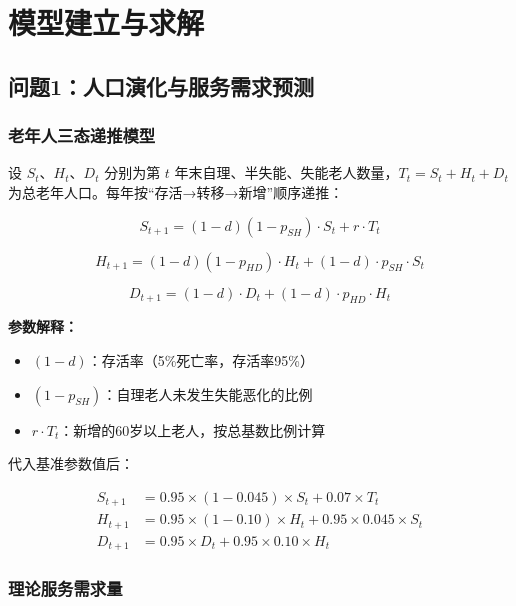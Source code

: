 \documentclass[UTF8]{ctexart}
\begin{document}
\section{模型建立与求解}
\subsection{问题1：人口演化与服务需求预测}

\subsubsection{老年人三态递推模型}

设 $S_t$、$H_t$、$D_t$ 分别为第 $t$ 年末自理、半失能、失能老人数量，$T_t=S_t+H_t+D_t$ 为总老年人口。每年按“存活→转移→新增”顺序递推：

\begin{equation}
S_{t+1} = (1-d)(1-p_{SH})\cdot S_t + r\cdot T_t \tag{1.1}
\end{equation}

\begin{equation}
H_{t+1} = (1-d)(1-p_{HD})\cdot H_t + (1-d)\cdot p_{SH}\cdot S_t \tag{1.2}
\end{equation}

\begin{equation}
D_{t+1} = (1-d)\cdot D_t + (1-d)\cdot p_{HD}\cdot H_t \tag{1.3}
\end{equation}

\textbf{参数解释：}
\begin{itemize}
    \item $(1-d)$：存活率（5\%死亡率，存活率95\%）
    \item $(1-p_{SH})$：自理老人未发生失能恶化的比例
    \item $r\cdot T_t$：新增的60岁以上老人，按总基数比例计算
\end{itemize}

代入基准参数值后：

\begin{equation}
\begin{aligned}
S_{t+1} &= 0.95 \times (1-0.045) \times S_t + 0.07 \times T_t \\
H_{t+1} &= 0.95 \times (1-0.10) \times H_t + 0.95 \times 0.045 \times S_t \\
D_{t+1} &= 0.95 \times D_t + 0.95 \times 0.10 \times H_t
\end{aligned}
\end{equation}

\subsubsection{理论服务需求量}
\end{document}
